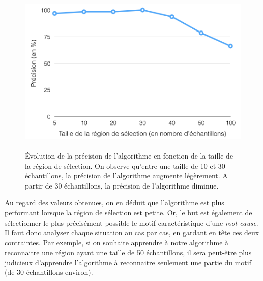 \begin{figure}[h]
	\centering\includegraphics[height=8cm]{images/precision_taille.png}
	\caption[Evolution de la précision de l'algorithme en fonction de la taille de la région de sélection]{Évolution de la précision de l'algorithme en fonction de la taille de la région de sélection.  On observe qu'entre une taille de 10 et 30 échantillons, la précision de l'algorithme augmente légèrement. A partir de 30 échantillons, la précision de l'algorithme diminue.}
	\label{fig: Evolution de la précision de l'algorithme en fonction de la taille de la région de sélection}
\end{figure} 

Au regard des valeurs obtenues, on en déduit que l'algorithme est plus performant lorsque la région de sélection est petite. Or, le but est également de sélectionner le plus précisément possible le motif caractéristique d'une \emph{root cause}. Il faut donc analyser chaque situation au cas par cas,  en gardant en tête ces deux contraintes. Par exemple, si on souhaite apprendre à notre algorithme à reconnaitre une région ayant une taille de 50 échantillons, il sera peut-être plus judicieux d'apprendre l'algorithme à reconnaitre seulement une partie du motif (de 30 échantillons environ).